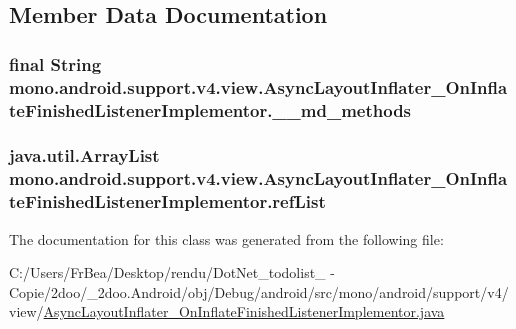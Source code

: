 \subsection{Member Data Documentation}
\hypertarget{classmono_1_1android_1_1support_1_1v4_1_1view_1_1_async_layout_inflater___on_inflate_finished_listener_implementor_2abef195e903df446ce88048c096ce16}{
\subsubsection[{\_\-\_\-md\_\-methods}]{\setlength{\rightskip}{0pt plus 5cm}final String {\bf mono.android.support.v4.view.AsyncLayoutInflater\_\-OnInflateFinishedListenerImplementor.\_\-\_\-md\_\-methods}}}
\label{classmono_1_1android_1_1support_1_1v4_1_1view_1_1_async_layout_inflater___on_inflate_finished_listener_implementor_2abef195e903df446ce88048c096ce16}


\hypertarget{classmono_1_1android_1_1support_1_1v4_1_1view_1_1_async_layout_inflater___on_inflate_finished_listener_implementor_ca8919b12aa30c167a769a16682f3b12}{
\subsubsection[{refList}]{\setlength{\rightskip}{0pt plus 5cm}java.util.ArrayList {\bf mono.android.support.v4.view.AsyncLayoutInflater\_\-OnInflateFinishedListenerImplementor.refList}}}
\label{classmono_1_1android_1_1support_1_1v4_1_1view_1_1_async_layout_inflater___on_inflate_finished_listener_implementor_ca8919b12aa30c167a769a16682f3b12}




The documentation for this class was generated from the following file:\begin{CompactItemize}
\item 
C:/Users/FrBea/Desktop/rendu/DotNet\_\-todolist\_ - Copie/2doo/\_\-2doo.Android/obj/Debug/android/src/mono/android/support/v4/view/\hyperlink{_async_layout_inflater___on_inflate_finished_listener_implementor_8java}{AsyncLayoutInflater\_\-OnInflateFinishedListenerImplementor.java}\end{CompactItemize}
